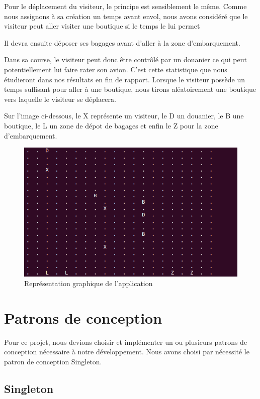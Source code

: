\documentclass[12pt,french]{article} %
\begin{document}
Pour le déplacement du visiteur, le principe est sensiblement le même. Comme nous assignons à sa création un temps avant envol, nous avons considéré que le visiteur peut aller visiter une boutique si le temps le lui permet

Il devra ensuite déposer ses bagages avant d'aller à la zone d'embarquement. 

Dans sa course, le visiteur peut donc être contrôlé par un douanier ce qui peut potentiellement lui faire rater son avion. C'est cette statistique que nous étudieront dans nos résultats en fin de rapport. Lorsque le visiteur possède un temps suffisant pour aller à une boutique, nous tirons aléatoirement une boutique vers laquelle le visiteur se déplacera.
\newline


Sur l'image ci-dessous, le X représente un visiteur, le D un douanier, le B une boutique, le L un zone de dépot de bagages et enfin le Z pour la zone d'embarquement.


\begin{figure}[H]
	\centering
	\includegraphics[scale=0.5]{mp.png}
	\caption{Représentation graphique de l'application}    
\end{figure}

\section{Patrons de conception}

Pour ce projet, nous devions choisir et implémenter un ou plusieurs patrons de conception nécessaire à notre développement. Nous avons choisi par nécessité le patron de conception Singleton.

\subsection{Singleton}
\end{document}
